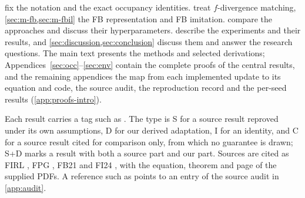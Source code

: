  fix the notation and the exact occupancy identities.
 treat $f$-divergence matching, \cref{sec:m-fb,sec:m-fbil} the FB representation and FB imitation.
 compare the approaches and discuss their hyperparameters.
 describe the experiments and their results, and \cref{sec:discussion,sec:conclusion} discuss them and answer the research questions.
The main text presents the methods and selected derivations; Appendices~\ref{sec:occ}--\ref{sec:env} contain the complete proofs of the central results, and the remaining appendices the map from each implemented update to its equation and code, the source audit, the reproduction record and the per-seed results (\cref{app:proofs-intro}).

Each result carries a tag such as .
The type is \textsf{S} for a source result reproved under its own assumptions, \textsf{D} for our derived adaptation, \textsf{I} for an identity, and \textsf{C} for a source result cited for comparison only, from which no guarantee is drawn; \textsf{S+D} marks a result with both a source part and our part.
Sources are cited as FIRL \citep{ni2021firl}, FPG \citep{agarwal2023fpg}, FB21 \citep{touati2021fb} and FI24 \citep{pirotta2024fast}, with the equation, theorem and page of the supplied PDFs.
A reference such as  points to an entry of the source audit in \cref{app:audit}.
